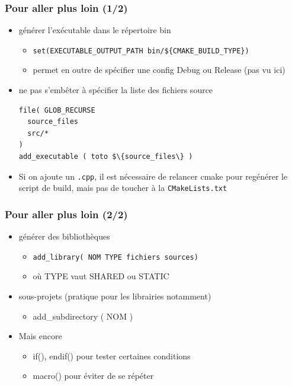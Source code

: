 \begin{frame}[fragile]\frametitle{Pour aller plus loin (1/2)}

\begin{itemize}
\itemsep1pt\parskip0pt
\item
  générer l'exécutable dans le répertoire bin

  \begin{itemize}
  \itemsep1pt\parskip0pt
  \item
    \texttt{set(EXECUTABLE\_OUTPUT\_PATH bin/\$\{CMAKE\_BUILD\_TYPE\})}
  \item
    permet en outre de spécifier une config Debug ou Release (pas vu
    ici)
  \end{itemize}
\item
  ne pas s'embêter à spécifier la liste des fichiers source
\begin{verbatim}
file( GLOB_RECURSE
  source_files
  src/*
)
add_executable ( toto $\{source_files\} )
\end{verbatim}
\item Si on ajoute un \texttt{.cpp}, il est nécessaire de relancer cmake pour regénérer le script de build, mais pas de toucher à la \texttt{CMakeLists.txt}
\end{itemize}

\end{frame}


\begin{frame}[fragile]\frametitle{Pour aller plus loin (2/2)}

\begin{itemize}
\itemsep1pt\parskip0pt
\item
  générer des bibliothèques


  \begin{itemize}
  \itemsep1pt\parskip0pt
  \item
    \texttt{add\_library( NOM TYPE fichiers sources)}
  \item
    où TYPE vaut SHARED ou STATIC
  \end{itemize}
\item sous-projets (pratique pour les librairies notamment)
\begin{itemize}
\item add\_subdirectory ( NOM )
\end{itemize}
\item Mais encore
\begin{itemize}
\item if(), endif() pour tester certaines conditions
\item macro() pour éviter de se répéter
\end{itemize}
\end{itemize}

\end{frame}

